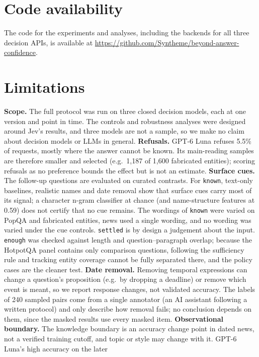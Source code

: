 \documentclass[10pt,twocolumn]{article}
\begin{document}
\section*{Code availability}
The code for the experiments and analyses, including the backends for all
three decision APIs, is available at
\url{https://github.com/Syntheme/beyond-answer-confidence}.

\section*{Limitations}
\label{sec:limitations}

\textbf{Scope.} The full protocol was run on three closed decision models,
each at one version and point in time. The controls and robustness
analyses were designed around Jev's results, and three models are not a
sample, so we make no claim about decision models or LLMs in general.
\textbf{Refusals.} GPT-6 Luna refuses 5.5\% of requests, mostly where the
answer cannot be known. Its main-reading samples are therefore smaller and
selected (e.g.\ 1{,}187 of 1{,}600 fabricated entities); scoring refusals as
no preference bounds the effect but is not an estimate. \textbf{Surface cues.} The follow-up
questions are evaluated on curated contrasts. For \texttt{known}, text-only
baselines, realistic names and date removal show that surface cues carry most
of its signal; a character n-gram classifier at chance (and name-structure
features at 0.59) does not certify that no cue remains. The wordings of
\texttt{known} were varied on PopQA and fabricated entities, news used a
single wording, and no wording was varied under the cue controls. \texttt{settled} is by design a judgement about the
input. \texttt{enough} was checked against length and question--paragraph
overlap; because the HotpotQA panel contains only comparison questions,
following the sufficiency rule and tracking entity coverage cannot be fully
separated there, and the policy cases are the cleaner test.
\textbf{Date removal.} Removing temporal expressions can change a question's
proposition (e.g.\ by dropping a deadline) or remove which event is meant,
so we report response changes, not validated accuracy. The labels of 240
sampled pairs come from a single annotator (an AI assistant following a
written protocol) and only describe how removal fails; no conclusion depends
on them, since the masked results use every masked item. \textbf{Observational boundary.} The knowledge boundary is an
accuracy change point in dated news, not a verified training cutoff, and
topic or style may change with it. GPT-6 Luna's high accuracy on the later
\end{document}

